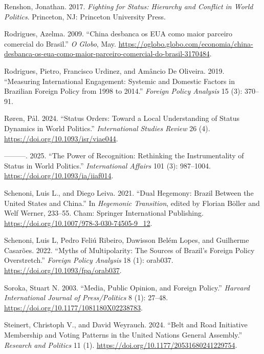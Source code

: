 \documentclass[
  12pt,
]{article}
\newlength{\cslhangindent}
\newenvironment{CSLReferences}[2] %
 {\begin{list}{}{%
  \setlength{\itemindent}{0pt}
  \setlength{\leftmargin}{0pt}
  \setlength{\parsep}{0pt}
  \ifodd #1
   \setlength{\leftmargin}{\cslhangindent}
   \setlength{\itemindent}{-1\cslhangindent}
  \fi
  \setlength{\itemsep}{#2\baselineskip}}}
 {\end{list}}
\begin{document}
\begin{CSLReferences}{1}{0}
Renshon, Jonathan. 2017. \emph{Fighting for {Status}: {Hierarchy} and {Conflict} in {World Politics}}. Princeton, NJ: Princeton University Press.

Rodrigues, Azelma. 2009. {``{China desbanca os EUA como maior parceiro comercial do Brasil}.''} \emph{O Globo}, May. \url{https://oglobo.globo.com/economia/china-desbanca-os-eua-como-maior-parceiro-comercial-do-brasil-3170484}.

Rodrigues, Pietro, Francisco Urdinez, and Amâncio De Oliveira. 2019. {``Measuring International Engagement: Systemic and Domestic Factors in {Brazilian} Foreign Policy from 1998 to 2014.''} \emph{Foreign Policy Analysis} 15 (3): 370--91.

Røren, Pål. 2024. {``Status {Orders}: {Toward} a {Local Understanding} of {Status Dynamics} in {World Politics}.''} \emph{International Studies Review} 26 (4). \url{https://doi.org/10.1093/isr/viae044}.

---------. 2025. {``The Power of Recognition: Rethinking the Instrumentality of Status in World Politics.''} \emph{International Affairs} 101 (3): 987--1004. \url{https://doi.org/10.1093/ia/iiaf014}.

Schenoni, Luis L., and Diego Leiva. 2021. {``Dual {Hegemony}: {Brazil Between} the {United States} and {China}.''} In \emph{Hegemonic {Transition}}, edited by Florian Böller and Welf Werner, 233--55. Cham: Springer International Publishing. \url{https://doi.org/10.1007/978-3-030-74505-9_12}.

Schenoni, Luis L, Pedro Feliú Ribeiro, Dawisson Belém Lopes, and Guilherme Casarões. 2022. {``Myths of {Multipolarity}: {The Sources} of {Brazil}'s {Foreign Policy Overstretch}.''} \emph{Foreign Policy Analysis} 18 (1): orab037. \url{https://doi.org/10.1093/fpa/orab037}.

Soroka, Stuart N. 2003. {``Media, {Public Opinion}, and {Foreign Policy}.''} \emph{Harvard International Journal of Press/Politics} 8 (1): 27--48. \url{https://doi.org/10.1177/1081180X02238783}.

Steinert, Christoph V., and David Weyrauch. 2024. {``Belt and Road Initiative Membership and Voting Patterns in the {United Nations General Assembly}.''} \emph{Research and Politics} 11 (1). \url{https://doi.org/10.1177/20531680241229754}.


\end{CSLReferences}
\end{document}
